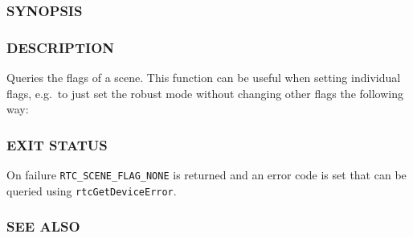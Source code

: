 \begin{Shaded}
\begin{Highlighting}[]
\OperatorTok{{-}}
\end{Highlighting}
\end{Shaded}

\subsubsection{SYNOPSIS}\label{synopsis}

\begin{Shaded}
\begin{Highlighting}[]

\OperatorTok{(}\OperatorTok{);}
\end{Highlighting}
\end{Shaded}

\subsubsection{DESCRIPTION}\label{description}

Queries the flags of a scene. This function can be useful when setting
individual flags, e.g.~to just set the robust mode without changing
other flags the following way:

\begin{Shaded}
\begin{Highlighting}[]
\OperatorTok{=}\OperatorTok{(}\OperatorTok{);}
\OperatorTok{(}\OperatorTok{,}\OperatorTok{|}\OperatorTok{);}
\end{Highlighting}
\end{Shaded}

\subsubsection{EXIT STATUS}\label{exit-status}

On failure \texttt{RTC\_SCENE\_FLAG\_NONE} is returned and an error code
is set that can be queried using \texttt{rtcGetDeviceError}.

\subsubsection{SEE ALSO}\label{see-also}


